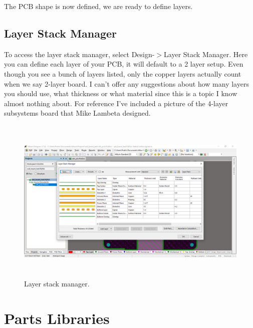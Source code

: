 \documentclass{report}
\begin{document}
	The PCB shape is now defined, we are ready to define layers.
	
	\section{Layer Stack Manager}
	To access the layer stack manager, select Design-$>$Layer Stack Manager. Here you can define each layer of your PCB, it will default to a 2 layer setup. Even though you see a bunch of layers listed, only the copper layers actually count when we say 2-layer board. I can't offer any suggestions about how many layers you should use, what thickness or what material since this is a topic I know almost nothing about. For reference I've included a picture of the 4-layer subsystems board that Mike Lambeta designed.
	
	\begin{figure}[H]	
		\centering
		\includegraphics[width=16cm, height=8cm]{pics/layer_stack.png}
		\caption{Layer stack manager.}
		\label{fig 6}
	\end{figure}
	
	\chapter{Parts Libraries}
\end{document}
